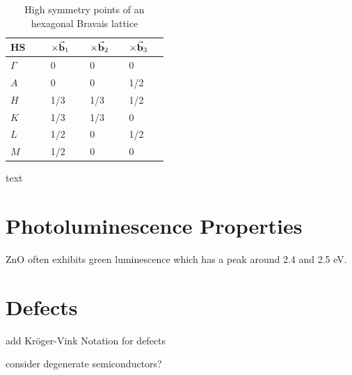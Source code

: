 \begin{table}[tbh!]
	\centering
	\caption{High symmetry points of an hexagonal Bravais lattice}
	\label{tab:HS}
	\begin{tabular}[t]{K{0.15\linewidth}K{0.1\linewidth}K{0.1\linewidth}K{0.1\linewidth}}
	\toprule
	\textbf{HS} & $\times \va{b}_1$ & $\times \va{b}_2$ & $\times \va{b}_3$ \\ \midrule
	$\Gamma$ & 0 & 0 & 0 \\
	$A$ & 0 & 0 & 1/2 \\
	$H$ & 1/3 & 1/3 & 1/2 \\
	$K$ & 1/3 & 1/3 & 0 \\
	$L$ & 1/2 & 0 & 1/2 \\
	$M$ & 1/2 & 0 & 0 \\ \bottomrule
	\end{tabular}
\end{table}

\clearpage


text
\section{Photoluminescence Properties}
ZnO often exhibits green luminescence which has a peak around 2.4 and 2.5 eV.
\section{Defects}
add Kröger-Vink Notation for defects

consider degenerate semiconductors?

 